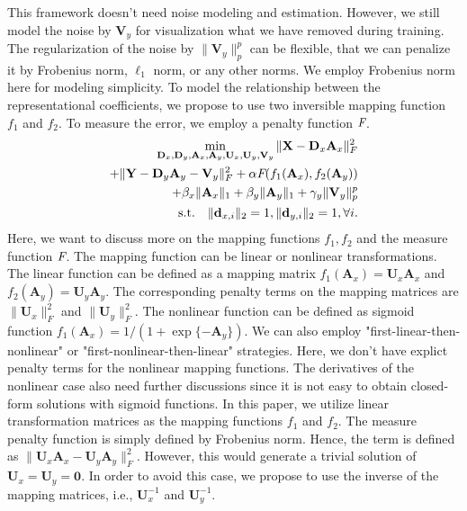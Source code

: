 \documentclass[10pt,twocolumn,letterpaper]{article}
\begin{document}
This framework doesn't need noise modeling and estimation. However, we still model the noise by $\mathbf{V}_{y}$ for visualization what we have removed during training. The regularization of the noise by $\|\mathbf{V}_{y}\|_{p}^{p}$ can be flexible, that we can penalize it by Frobenius norm, $\ell_{1}$ norm, or any other norms. We employ Frobenius norm here for modeling simplicity. To model the relationship between the representational coefficients, we propose to use two inversible mapping function $f_{1}$ and $f_{2}$. To measure the error, we employ a penalty function $\emph{F}$.
\begin{equation}
\begin{split}
\min_{\mathbf{D}_{x},\mathbf{D}_{y},\mathbf{A}_{x},\mathbf{A}_{y},\mathbf{U}_{x},\mathbf{U}_{y},\mathbf{V}_{y}}
\|\mathbf{X}-\mathbf{D}_{x}\mathbf{A}_{x}\|_{F}^{2}&
\\
+
\|\mathbf{Y}-\mathbf{D}_{y}\mathbf{A}_{y}-\mathbf{V}_{y}\|_{F}^{2}
+
\alpha
\emph{F}(f_{1}(\mathbf{A}_{x}),f_{2}(\mathbf{A}_{y}))&
\\
+
\beta_{x}\|\mathbf{A}_{x}\|_{1}
+
\beta_{y}\|\mathbf{A}_{y}\|_{1}
+
\gamma_{y}\|\mathbf{V}_{y}\|_{p}^{p}
\\
\text{s.t.}
\quad
\|\mathbf{d}_{x,i}\|_{2}=1
, 
\|\mathbf{d}_{y,i}\|_{2}=1
,
\forall{i}
.
\end{split}
\end{equation}
Here, we want to discuss more on the mapping functions $f_{1}, f_{2}$ and the measure function $\emph{F}$. The mapping function can be linear or nonlinear transformations. The linear function can be defined as a mapping matrix $f_{1}(\mathbf{A}_{x})=\mathbf{U}_{x}\mathbf{A}_{x}$ and $f_{2}(\mathbf{A}_{y})=\mathbf{U}_{y}\mathbf{A}_{y}$. The corresponding penalty terms on the mapping matrices are $\|\mathbf{U}_{x}\|_{F}^{2}$ and $\|\mathbf{U}_{y}\|_{F}^{2}$. The nonlinear function can be defined as sigmoid function $f_{1}(\mathbf{A}_{x})=1/(1+\exp\{-\mathbf{A}_{y}\})$. We can also employ "first-linear-then-nonlinear" or "first-nonlinear-then-linear" strategies. Here, we don't have explict penalty terms for the nonlinear mapping functions. The derivatives of the nonlinear case also need further discussions since it is not easy to obtain closed-form solutions with sigmoid functions. In this paper, we utilize linear transformation matrices as the mapping functions $f_{1}$ and $f_{2}$. The measure penalty function is simply defined by Frobenius norm. Hence, the term is defined as $\|\mathbf{U}_{x}\mathbf{A}_{x}-\mathbf{U}_{y}\mathbf{A}_{y}\|_{F}^{2}$. However, this would generate a trivial solution of $\mathbf{U}_{x}=\mathbf{U}_{y}=\mathbf{0}$. In order to avoid this case, we propose to use the inverse of the mapping matrices, i.e., $\mathbf{U}_{x}^{-1}$ and $\mathbf{U}_{y}^{-1}$.
\end{document}

